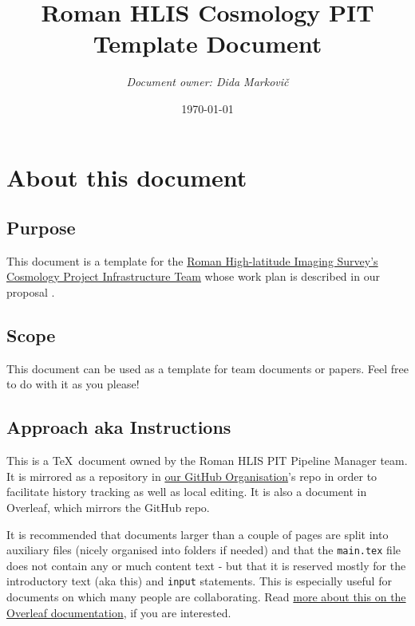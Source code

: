 \documentclass{article}
\title{Roman HLIS Cosmology PIT\\
Template Document}
\author{\it Document owner: \it Dida Markovi\v{c}}
\date{\today\\ \version} %
\begin{document}
\maketitle

\tableofcontents

\newpage
\section{About this document}

\subsection{Purpose}

This document is a template for the \href{https://roman-hlis-cosmology.caltech.edu/}{Roman High-latitude Imaging Survey's Cosmology Project Infrastructure Team} whose work plan is described in our proposal \citep{proposal}. 

\subsection{Scope}

This document can be used as a template for team documents or papers. Feel free to do with it as you please! 

\subsection{Approach aka Instructions}

This is a \TeX\ document owned by the Roman HLIS PIT Pipeline Manager team. It is mirrored as a repository in \href{https://github.com/Roman-HLIS-Cosmology-PIT}{our GitHub Organisation}'s repo in order to facilitate history tracking as well as local editing. It is also a document in Overleaf, which mirrors the GitHub repo.

It is recommended that documents larger than a couple of pages are split into auxiliary files (nicely organised into folders if needed) and that the \texttt{main.tex} file does not contain any or much content text - but that it is reserved mostly for the introductory text (aka this) and \texttt{input} statements. This is especially useful for documents on which many people are collaborating. Read \href{https://www.overleaf.com/learn/latex/Management_in_a_large_project}{more about this on the Overleaf documentation}, if you are interested.
\end{document}

